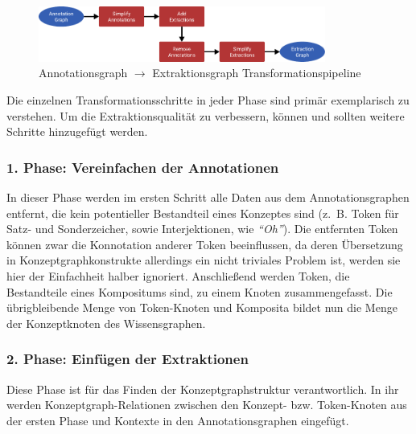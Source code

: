 \begin{figure}[h]
	\centering
	\includegraphics[width=0.84\textwidth]{gfx/text2kg/transformationPipeline.pdf}
	\caption{Annotationsgraph $\rightarrow$ Extraktionsgraph Transformationspipeline}\label{fig:text2kg:transformationPipeline}
\end{figure}
Die einzelnen Transformationsschritte in jeder Phase sind primär exemplarisch zu verstehen.
Um die Extraktionsqualität zu verbessern, können und sollten weitere Schritte hinzugefügt werden.

\subsubsection{1. Phase: Vereinfachen der Annotationen}
In dieser Phase werden im ersten Schritt alle Daten aus dem Annotationsgraphen entfernt, die kein potentieller Bestandteil eines Konzeptes sind (z.~B. Token für Satz- und Sonderzeicher, sowie Interjektionen, wie \textit{``Oh''}).
Die entfernten Token können zwar die Konnotation anderer Token beeinflussen, da deren Übersetzung in Konzeptgraphkonstrukte allerdings ein nicht triviales Problem ist, werden sie hier der Einfachheit halber ignoriert.
Anschließend werden Token, die Bestandteile eines Kompositums sind, zu einem Knoten zusammengefasst.
Die übrigbleibende Menge von Token-Knoten und Komposita bildet nun die Menge der Konzeptknoten des Wissensgraphen.

\subsubsection{2. Phase: Einfügen der Extraktionen}
Diese Phase ist für das Finden der Konzeptgraphstruktur verantwortlich.
In ihr werden Konzeptgraph-Relationen zwischen den Konzept- bzw. Token-Knoten aus der ersten Phase und Kontexte in den Annotationsgraphen eingefügt.

